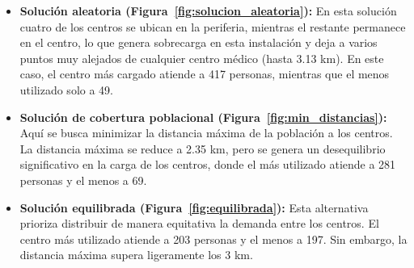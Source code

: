 \documentclass[12pt,a4paper]{book}
\begin{document}
\begin{itemize}
    \item \textbf{Solución aleatoria (Figura~\ref{fig:solucion_aleatoria}):} En esta solución cuatro de los centros se ubican en la periferia, mientras el restante permanece en el centro, lo que genera sobrecarga en esta instalación y deja a varios puntos muy alejados de cualquier centro médico (hasta 3.13 km). En este caso, el centro más cargado atiende a 417 personas, mientras que el menos utilizado solo a 49.
    \item \textbf{Solución de cobertura poblacional (Figura~\ref{fig:min_distancias}):} Aquí se busca minimizar la distancia máxima de la población a los centros. La distancia máxima se reduce a 2.35 km, pero se genera un desequilibrio significativo en la carga de los centros, donde el más utilizado atiende a 281 personas y el menos a 69.
    \item \textbf{Solución equilibrada (Figura~\ref{fig:equilibrada}):} Esta alternativa prioriza distribuir de manera equitativa la demanda entre los centros. El centro más utilizado atiende a 203 personas y el menos a 197. Sin embargo, la distancia máxima supera ligeramente los 3 km.
\end{itemize}
\end{document}

